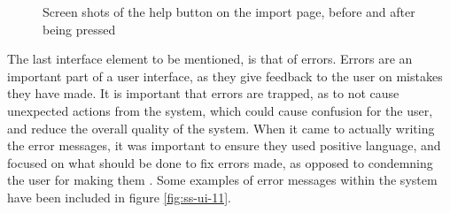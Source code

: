 \begin{figure}[ht!]
	\vspace{-1mm}
	\begin{center}
	\end{center}
	\vspace{-6mm}
	\captionsetup{justification=centering,margin=2cm}
	\caption{Screen shots of the help button on the import page, before and after being pressed}
	\label{fig:ss-ui-10}
\end{figure}

\noindent 
The last interface element to be mentioned, is that of errors. Errors are an important part of a user interface, as they give feedback to the user on mistakes they have made. It is important that errors are trapped, as to not cause unexpected actions from the system, which could cause confusion for the user, and reduce the overall quality of the system. When it came to actually writing the error messages, it was important to ensure they used positive language, and focused on what should be done to fix errors made, as opposed to condemning the user for making them \cite{shneiderman1982future}. Some examples of error messages within the system have been included in figure \ref{fig:ss-ui-11}.


